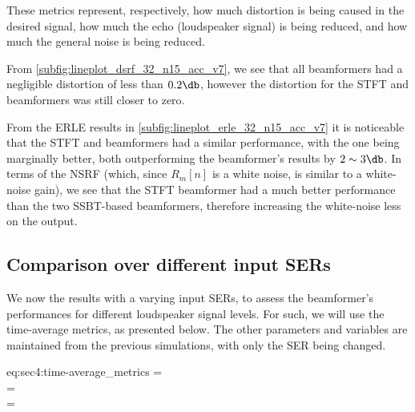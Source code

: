 These metrics represent, respectively, how much distortion is being caused in the desired signal, how much the echo (loudspeaker signal) is being reduced, and how much the general noise is being reduced.

From \cref{subfig:lineplot_dsrf_32_n15_acc_v7}, we see that all beamformers had a negligible distortion of less than $0.2\dB$, however the distortion for the STFT and \tssbt{} beamformers was still closer to zero.

From the ERLE results in \cref{subfig:lineplot_erle_32_n15_acc_v7} it is noticeable that the STFT and \nssbt{} beamformers had a similar performance, with the \tssbt{} one being marginally better, both outperforming the \nssbt{} beamformer's results by $2\sim3\dB$. In terms of the NSRF (which, since $R_m[n]$ is a white noise, is similar to a white-noise gain), we see that the STFT beamformer had a much better performance than the two SSBT-based beamformers, therefore increasing the white-noise less on the output.

\subsection{Comparison over different input SERs}

We now the results with a varying input SERs, to assess the beamformer's performances for different loudspeaker signal levels. For such, we will use the time-average metrics, as presented below. The other parameters and variables are maintained from the previous simulations, with only the SER being changed.

\begin{subgather}{eq:sec4:time-average_metrics}
	\dsrf =  \\
	\erle =  \\
	\nsrf = 
\end{subgather}

